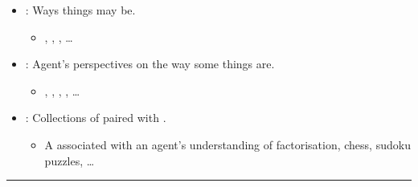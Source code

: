 \documentclass[10pt]{article}
\newcommand\lLine{{\color{lightgray} \noindent\rule{\textwidth}{0.4pt}}}
\begin{document}
\begin{note}

  \begin{itemize}
  \item
    \underline{\textbf{}}: Ways things may be.
    \begin{itemize}
    \item
      , , , \dots
    \end{itemize}
  \item
    \underline{\textbf{}}: Agent's perspectives on the way some things are.
    \begin{itemize}
    \item
      , , , , \dots
    \end{itemize}
  \item
    \underline{\textbf{}}: Collections of  paired with .
    \begin{itemize}
    \item
      A \pool{} associated with an agent's understanding of factorisation, chess, sudoku puzzles, \dots
    \end{itemize}
  \end{itemize}


  \lLine


\end{note}
\end{document}
